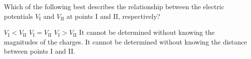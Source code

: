 \begin{questions}\setcounter{question}{1}\question
Which of the following best describes the relationship between the electric potentials $V_\mathrm{I}$ and $V_\mathrm{II}$ at points I and II, respectively?

\begin{choices}
\choice $V_\mathrm{I} < V_\mathrm{II}$
\choice $V_\mathrm{I} = V_\mathrm{II}$
\choice $V_\mathrm{I} > V_\mathrm{II}$
\choice It cannot be determined without knowing the magnitudes of the charges.
\choice It cannot be determined without knowing the distance between points I and II.
\end{choices}\end{questions}
